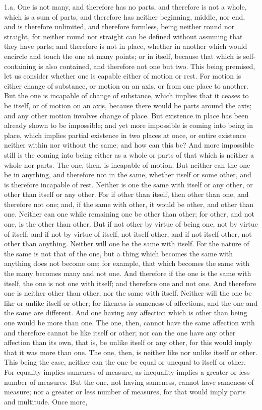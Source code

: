 \documentclass[11pt,letter]{article}
\begin{document}
\par  1.a. One is not many, and therefore has no parts, and therefore is not a whole, which is a sum of parts, and therefore has neither beginning, middle, nor end, and is therefore unlimited, and therefore formless, being neither round nor straight, for neither round nor straight can be defined without assuming that they have parts; and therefore is not in place, whether in another which would encircle and touch the one at many points; or in itself, because that which is self-containing is also contained, and therefore not one but two. This being premised, let us consider whether one is capable either of motion or rest. For motion is either change of substance, or motion on an axis, or from one place to another. But the one is incapable of change of substance, which implies that it ceases to be itself, or of motion on an axis, because there would be parts around the axis; and any other motion involves change of place. But existence in place has been already shown to be impossible; and yet more impossible is coming into being in place, which implies partial existence in two places at once, or entire existence neither within nor without the same; and how can this be? And more impossible still is the coming into being either as a whole or parts of that which is neither a whole nor parts. The one, then, is incapable of motion. But neither can the one be in anything, and therefore not in the same, whether itself or some other, and is therefore incapable of rest. Neither is one the same with itself or any other, or other than itself or any other. For if other than itself, then other than one, and therefore not one; and, if the same with other, it would be other, and other than one. Neither can one while remaining one be other than other; for other, and not one, is the other than other. But if not other by virtue of being one, not by virtue of itself; and if not by virtue of itself, not itself other, and if not itself other, not other than anything. Neither will one be the same with itself. For the nature of the same is not that of the one, but a thing which becomes the same with anything does not become one; for example, that which becomes the same with the many becomes many and not one. And therefore if the one is the same with itself, the one is not one with itself; and therefore one and not one. And therefore one is neither other than other, nor the same with itself. Neither will the one be like or unlike itself or other; for likeness is sameness of affections, and the one and the same are different. And one having any affection which is other than being one would be more than one. The one, then, cannot have the same affection with and therefore cannot be like itself or other; nor can the one have any other affection than its own, that is, be unlike itself or any other, for this would imply that it was more than one. The one, then, is neither like nor unlike itself or other. This being the case, neither can the one be equal or unequal to itself or other. For equality implies sameness of measure, as inequality implies a greater or less number of measures. But the one, not having sameness, cannot have sameness of measure; nor a greater or less number of measures, for that would imply parts and multitude. Once more, 
\end{document}
